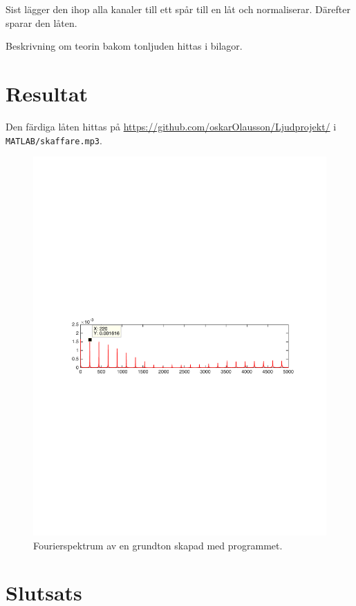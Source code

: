 \documentclass[12pt]{article}
\begin{document}
Sist lägger den ihop alla kanaler till ett spår till en låt och normaliserar.
Därefter sparar den låten.

Beskrivning om teorin bakom tonljuden hittas i bilagor.

\section{Resultat}

Den färdiga låten hittas på \url{https://github.com/oskarOlausson/Ljudprojekt/}
i \texttt{MATLAB/skaffare.mp3}. 

\begin{figure}[!htb]
    \centering
    \includegraphics[scale=0.5]{onetone.pdf}
    \caption{Fourierspektrum av en grundton skapad med programmet.}
    \label{fig:onetone}
\end{figure}

\section{Slutsats}
\end{document}
